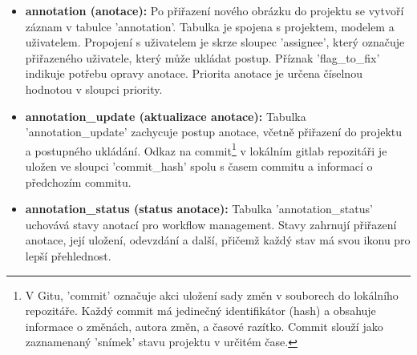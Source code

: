 \begin{itemize}
    \item \textbf{annotation (anotace):}
    Po přiřazení nového obrázku do projektu se vytvoří záznam v tabulce 'annotation'. Tabulka je spojena s projektem, modelem a uživatelem. Propojení s uživatelem je skrze sloupec 'assignee', který označuje přiřazeného uživatele, který může ukládat postup. Příznak 'flag\_to\_fix' indikuje potřebu opravy anotace. Priorita anotace je určena číselnou hodnotou v sloupci priority.
    
    \item \textbf{annotation\_update (aktualizace anotace):}
    Tabulka 'annotation\_update' zachycuje postup anotace, včetně přiřazení do projektu a postupného ukládání. Odkaz na commit\footnote{V Gitu, 'commit' označuje akci uložení sady změn v souborech do lokálního repozitáře. Každý commit má jedinečný identifikátor (hash) a obsahuje informace o změnách, autora změn, a časové razítko. Commit slouží jako zaznamenaný 'snímek' stavu projektu v určitém čase.} v lokálním gitlab repozitáři je uložen ve sloupci 'commit\_hash' spolu s časem commitu a informací o předchozím commitu.
    
    \item \textbf{annotation\_status (status anotace):}
    Tabulka 'annotation\_status' uchovává stavy anotací pro workflow management. Stavy zahrnují přiřazení anotace, její uložení, odevzdání a další, přičemž každý stav má svou ikonu pro lepší přehlednost.
\end{itemize}
